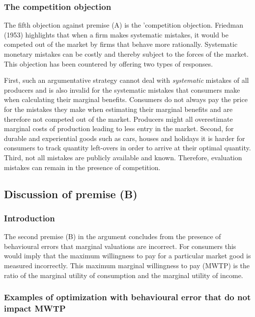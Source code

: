 \documentclass[
]{book}
\begin{document}
\hypertarget{the-competition-objection}{%
\subsubsection{The competition objection}\label{the-competition-objection}}

The fifth objection against premise (A) is the 'competition objection. Friedman (1953) highlights that when a firm makes systematic mistakes, it would be competed out of the market by firms that behave more rationally. Systematic monetary mistakes can be costly and thereby subject to the forces of the market. This objection has been countered by offering two types of responses.

First, such an argumentative strategy cannot deal with \emph{systematic} mistakes of all producers and is also invalid for the systematic mistakes that consumers make when calculating their marginal benefits. Consumers do not always pay the price for the mistakes they make when estimating their marginal benefits and are therefore not competed out of the market. Producers might all overestimate marginal costs of production leading to less entry in the market. Second, for durable and experiential goods such as cars, houses and holidays it is harder for consumers to track quantity left-overs in order to arrive at their optimal quantity. Third, not all mistakes are publicly available and known. Therefore, evaluation mistakes can remain in the presence of competition.

\hypertarget{discussion-of-premise-b}{%
\subsection{Discussion of premise (B)}\label{discussion-of-premise-b}}

\hypertarget{introduction-7}{%
\subsubsection{Introduction}\label{introduction-7}}

The second premise (B) in the argument concludes from the presence of behavioural errors that marginal valuations are incorrect. For consumers this would imply that the maximum willingness to pay for a particular market good is measured incorrectly. This maximum marginal willingness to pay (MWTP) is the ratio of the marginal utility of consumption and the marginal utility of income.

\hypertarget{examples-of-optimization-with-behavioural-error-that-do-not-impact-mwtp}{%
\subsubsection{Examples of optimization with behavioural error that do not impact MWTP}\label{examples-of-optimization-with-behavioural-error-that-do-not-impact-mwtp}}
\end{document}
